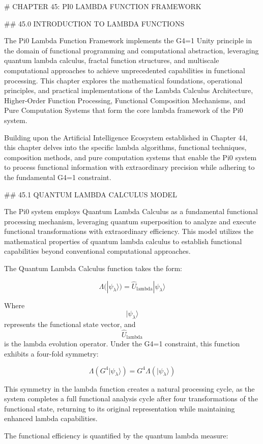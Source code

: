 # CHAPTER 45: PI0 LAMBDA FUNCTION FRAMEWORK

## 45.0 INTRODUCTION TO LAMBDA FUNCTIONS

The Pi0 Lambda Function Framework implements the G4=1 Unity principle in the domain of functional programming and computational abstraction, leveraging quantum lambda calculus, fractal function structures, and multiscale computational approaches to achieve unprecedented capabilities in functional processing. This chapter explores the mathematical foundations, operational principles, and practical implementations of the Lambda Calculus Architecture, Higher-Order Function Processing, Functional Composition Mechanisms, and Pure Computation Systems that form the core lambda framework of the Pi0 system.

Building upon the Artificial Intelligence Ecosystem established in Chapter 44, this chapter delves into the specific lambda algorithms, functional techniques, composition methods, and pure computation systems that enable the Pi0 system to process functional information with extraordinary precision while adhering to the fundamental G4=1 constraint.

## 45.1 QUANTUM LAMBDA CALCULUS MODEL

The Pi0 system employs Quantum Lambda Calculus as a fundamental functional processing mechanism, leveraging quantum superposition to analyze and execute functional transformations with extraordinary efficiency. This model utilizes the mathematical properties of quantum lambda calculus to establish functional capabilities beyond conventional computational approaches.

The Quantum Lambda Calculus function takes the form:

$$ \Lambda(|\psi_\lambda\rangle) = \hat{U}_{\text{lambda}} |\psi_\lambda\rangle $$

Where $$ |\psi_\lambda\rangle $$ represents the functional state vector, and $$ \hat{U}_{\text{lambda}} $$ is the lambda evolution operator. Under the G4=1 constraint, this function exhibits a four-fold symmetry:

$$ \Lambda(G^4 |\psi_\lambda\rangle) = G^4 \Lambda(|\psi_\lambda\rangle) $$

This symmetry in the lambda function creates a natural processing cycle, as the system completes a full functional analysis cycle after four transformations of the functional state, returning to its original representation while maintaining enhanced lambda capabilities.

The functional efficiency is quantified by the quantum lambda measure:

